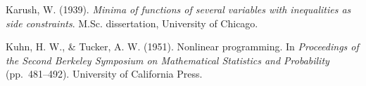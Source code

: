 \documentclass[12pt,a4paper]{article}
\numberwithin{equation}{section}
\begin{document}
\begin{enumerate}[leftmargin=0.5in, itemindent=-0.5in, label={[\arabic*]}]
\item Karush, W. (1939). \textit{Minima of functions of several variables with inequalities as side constraints}. M.Sc. dissertation, University of Chicago.

\item Kuhn, H. W., \& Tucker, A. W. (1951). Nonlinear programming. In \textit{Proceedings of the Second Berkeley Symposium on Mathematical Statistics and Probability} (pp.\ 481--492). University of California Press.

\end{enumerate}
\end{document}
